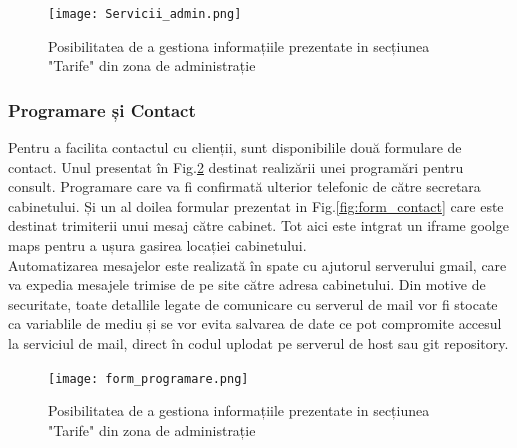 \documentclass[11pt]{scrartcl} %
\begin{document}
\begin{figure}[h] %
	\centering
	\texttt{[image: Servicii\_admin.png]} %
	\caption{Posibilitatea de a gestiona informațiile prezentate in secțiunea "Tarife" din zona de administrație}
	\label{fig:serv_admin}
\end{figure}



\subsubsection{Programare și Contact}

Pentru a facilita contactul cu clienții, sunt disponibilile două formulare de contact. Unul presentat în Fig.\ref{fig:form_prog} destinat realizării unei programări pentru consult. Programare care va fi confirmată ulterior telefonic de către secretara cabinetului. Și un al doilea formular prezentat in Fig.\ref{fig:form_contact} care este destinat trimiterii unui mesaj către cabinet. Tot aici este intgrat un iframe goolge maps pentru a ușura gasirea locației cabinetului.\\
Automatizarea mesajelor este realizată în spate cu ajutorul serverului gmail, care va expedia mesajele trimise de pe site către adresa cabinetului. Din motive de securitate, toate detallile legate de comunicare cu serverul de mail vor fi stocate ca variablile de mediu și se vor evita salvarea de date ce pot compromite accesul la serviciul de mail, direct în codul uplodat pe serverul de host sau git repository.


 

\begin{figure}[h] %
	\centering
	\texttt{[image: form\_programare.png]} %
	\caption{Posibilitatea de a gestiona informațiile prezentate in secțiunea "Tarife" din zona de administrație}
	\label{fig:form_prog}
\end{figure}
\end{document}
